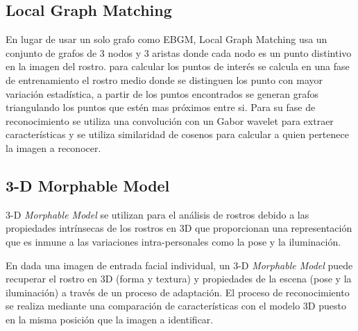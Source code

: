 \subsection{Local Graph Matching}
En lugar de usar un solo grafo como EBGM, Local Graph Matching \cite{fazl2007robust} usa un conjunto de grafos de 3 nodos y 3 aristas donde cada nodo es un punto distintivo en la imagen del rostro. para calcular los puntos de interés se calcula en una fase de entrenamiento el rostro medio donde se distinguen los punto con mayor variación estadística, a partir de los puntos encontrados se generan grafos triangulando los puntos que estén mas próximos entre si.
Para su fase de reconocimiento se utiliza una convolución con un Gabor wavelet para extraer características y se utiliza similaridad de cosenos para calcular a quien pertenece la imagen a reconocer.

\subsection{3-D Morphable Model}
3-D \textit{Morphable Model} se utilizan para el análisis de rostros debido a las propiedades intrínsecas de los rostros en 3D que proporcionan una representación que es inmune a las variaciones intra-personales como la pose y la iluminación. 

En \cite{huang2003component} dada una imagen de entrada facial individual, un 3-D \textit{Morphable Model} puede recuperar el rostro en 3D (forma y textura) y propiedades de la escena (pose y la iluminación) a través de un proceso de adaptación. El proceso de reconocimiento se realiza mediante una comparación de características con el modelo 3D puesto en la misma posición que la imagen a identificar.




